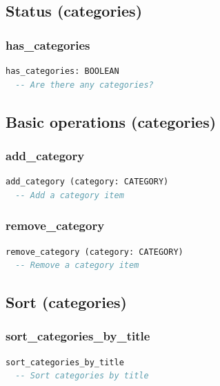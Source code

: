 \subsection{Status (categories)}
\label{sec:item-status-categories}

\subsubsection{has\_categories}

\begin{lstlisting}[language=Eiffel]
has_categories: BOOLEAN
  -- Are there any categories?
\end{lstlisting}

\subsection{Basic operations (categories)}
\label{sec:item-basic-operations-categories}

\subsubsection{add\_category}

\begin{lstlisting}[language=Eiffel]
add_category (category: CATEGORY)
  -- Add a category item
\end{lstlisting}

\subsubsection{remove\_category}

\begin{lstlisting}[language=Eiffel]
remove_category (category: CATEGORY)
  -- Remove a category item
\end{lstlisting}

\subsection{Sort (categories)}
\label{sec:item-sort-categories}

\subsubsection{sort\_categories\_by\_title}

\begin{lstlisting}[language=Eiffel]
sort_categories_by_title
  -- Sort categories by title
\end{lstlisting}

